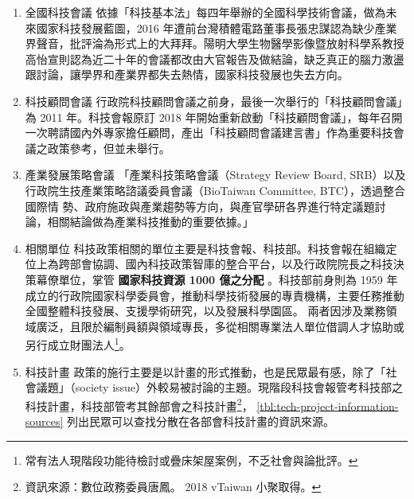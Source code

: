 \documentclass[12pt,a4paper]{article}
\begin{document}
\begin{enumerate}
\item 全國科技會議
\label{sec:org06a51df}
依據「科技基本法」每四年舉辦的全國科學技術會議，做為未來國家科技發展藍圖，2016 年遭前台灣積體電路董事長張忠謀認為缺少產業界聲音，批評淪為形式上的大拜拜。陽明大學生物醫學影像暨放射科學系教授高怡宣則認為近二十年的會議都改由大官報告及做結論，缺乏真正的腦力激盪跟討論，讓學界和產業界都失去熱情，國家科技發展也失去方向。
\item 科技顧問會議
\label{sec:orge2d413a}
行政院科技顧問會議之前身，最後一次舉行的「科技顧問會議」為 2011 年。科技會報原訂 2018 年開始重新啟動「科技顧問會議」，每年召開 一次聘請國內外專家擔任顧問，產出「科技顧問會議建言書」作為重要科技會議之政策參考，但並未舉行。
\item 產業發展策略會議
\label{sec:org5699320}
「產業科技策略會議（Strategy Review Board, SRB）以及行政院生技產業策略諮議委員會議（BioTaiwan Committee, BTC），透過整合國際情
勢、政府施政與產業趨勢等方向，與產官學研各界進行特定議題討論，相關結論做為產業科技推動的重要依據。」\citep*{guo17}
\item 相關單位
\label{sec:orga616062}
科技政策相關的單位主要是科技會報、科技部。科技會報在組織定位上為跨部會協調、國內科技政策智庫的整合平台，以及行政院院長之科技決策幕僚單位，掌管 \textbf{國家科技資源 1000 億之分配} 。科技部前身則為 1959 年成立的行政院國家科學委員會，推動科學技術發展的專責機構，主要任務推動全國整體科技發展、支援學術研究，以及發展科學園區。
兩者因涉及業務領域廣泛，且限於編制員額與領域專長，多從相關專業法人單位借調人才協助或另行成立財團法人\footnote{常有法人現階段功能待檢討或疊床架屋案例，不乏社會與論批評。}。
\item 科技計畫
\label{sec:org0e46936}
政策的施行主要是以計畫的形式推動，也是民眾最有感，除了「社會議題」（society issue）外較易被討論的主題。現階段科技會報管考科技部之科技計畫，科技部管考其餘部會之科技計畫\footnote{資訊來源：數位政務委員唐鳳。 2018 vTaiwan 小聚取得。}， \ref{tbl:tech-project-information-sources} 列出民眾可以查找分散在各部會科技計畫的資訊來源。


\end{enumerate}
\end{document}
